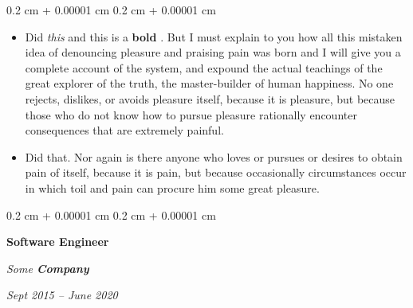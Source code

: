 \documentclass[10pt, letterpaper]{article}
\newenvironment{highlights}{
    \begin{itemize}[
        topsep=0.10 cm,
        parsep=0.10 cm,
        partopsep=0pt,
        itemsep=0pt,
        leftmargin=0.4 cm + 10pt
    ]
}{
    \end{itemize}
} %
\newenvironment{onecolentry}{
    \begin{adjustwidth}{
        0.2 cm + 0.00001 cm
    }{
        0.2 cm + 0.00001 cm
    }
}{
    \end{adjustwidth}
} %
\newenvironment{twocolentry}[2][]{
    \onecolentry
    \def\secondColumn{#2}
    \setcolumnwidth{\fill, 4.5 cm}
    \begin{paracol}{2}
}{
    \switchcolumn \raggedleft \secondColumn
    \end{paracol}
    \endonecolentry
} %
\let\hrefWithoutArrow\href
\renewcommand{\href}[2]{\hrefWithoutArrow{#1}{\ifthenelse{\equal{#2}{}}{ }{#2 }\raisebox{.15ex}{\footnotesize \faExternalLink*}}}
\begin{document}
        \vspace{0.10 cm}
        \begin{onecolentry}
            \begin{highlights}
                \item Did \textit{this} and this is a \textbf{bold} \href{https://example.com}{link}. But I must explain to you how all this mistaken idea of denouncing pleasure and praising pain was born and I will give you a complete account of the system, and expound the actual teachings of the great explorer of the truth, the master-builder of human happiness. No one rejects, dislikes, or avoids pleasure itself, because it is pleasure, but because those who do not know how to pursue pleasure rationally encounter consequences that are extremely painful.
                \item Did that. Nor again is there anyone who loves or pursues or desires to obtain pain of itself, because it is pain, but because occasionally circumstances occur in which toil and pain can procure him some great pleasure.
            \end{highlights}
        \end{onecolentry}


        \vspace{0.2 cm}

            \begin{twocolentry}{


        \textit{Sept 2015 – June 2020}    }
                \textbf{Software Engineer}

                \textit{Some \textbf{Company}}
            \end{twocolentry}
\end{document}
